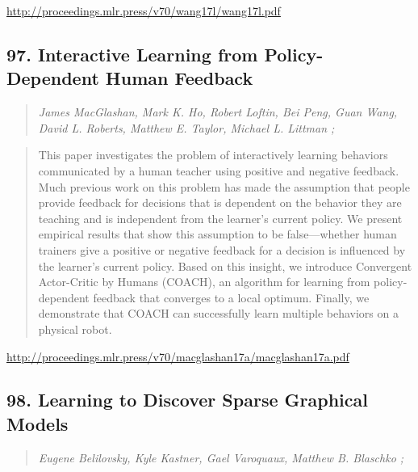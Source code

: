 \documentclass{article}
\begin{document}
\href{http://proceedings.mlr.press/v70/wang17l/wang17l.pdf}{http://proceedings.mlr.press/v70/wang17l/wang17l.pdf}

\subsection{97. Interactive Learning from Policy-Dependent Human Feedback}

\begin{quote}
\footnotesize{\textit{James MacGlashan, Mark K. Ho, Robert Loftin, Bei Peng, Guan Wang, David L. Roberts, Matthew E. Taylor, Michael L. Littman ;}}
\end{quote}

\begin{quote}
    This paper investigates the problem of interactively learning behaviors communicated by a human teacher using positive and negative feedback. Much previous work on this problem has made the assumption that people provide feedback for decisions that is dependent on the behavior they are teaching and is independent from the learner’s current policy. We present empirical results that show this assumption to be false—whether human trainers give a positive or negative feedback for a decision is influenced by the learner’s current policy. Based on this insight, we introduce Convergent Actor-Critic by Humans (COACH), an algorithm for learning from policy-dependent feedback that converges to a local optimum. Finally, we demonstrate that COACH can successfully learn multiple behaviors on a physical robot.  \end{quote}

\href{http://proceedings.mlr.press/v70/macglashan17a/macglashan17a.pdf}{http://proceedings.mlr.press/v70/macglashan17a/macglashan17a.pdf}

\subsection{98. Learning to Discover Sparse Graphical Models}

\begin{quote}
\footnotesize{\textit{Eugene Belilovsky, Kyle Kastner, Gael Varoquaux, Matthew B. Blaschko ;}}
\end{quote}
\end{document}
